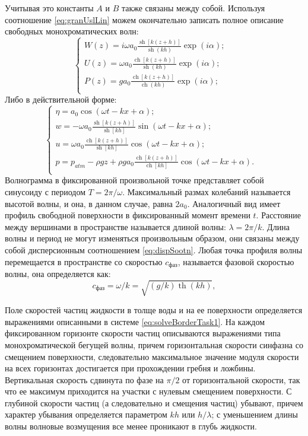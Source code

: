 Учитывая это константы $A$ и $B$ также связаны между собой. Используя соотношение \eqref{eq:granUslLin} можем окончательно записать полное описание свободных монохроматических волн:
\begin{equation}\label{eq:solveBorderTask1}
  \begin{cases}
  W(z)=i\omega a_0\frac{\operatorname{sh}[k(z+h)]}{\operatorname{sh}(kh)}\exp(i\alpha); & \\
  U(z)=\omega a_0\frac{\operatorname{ch}[k(z+h)]}{\operatorname{sh}(kh)}\exp(i\alpha); & \\
  P(z)=g a_0\frac{\operatorname{ch}[k(z+h)]}{\operatorname{ch}(kh)}\exp(i\alpha); & \\
  \end{cases}
\end{equation}
Либо в действительной форме:
\begin{equation}\label{eq:solveBorderTask1}
  \begin{cases}
  \eta=a_0\cos(\omega t-kx+\alpha); & \\
  w = -\omega a_0\frac{\operatorname{sh}[k(z+h)]}{\operatorname{sh}[kh]}\sin(\omega t - kx+\alpha); & \\
  u = \omega a_0\frac{\operatorname{ch}[k(z+h)]}{\operatorname{sh}[kh]}\cos(\omega t - kx+\alpha); & \\
  p = p_{atm}-\rho gz+\rho ga_0\frac{\operatorname{ch}[k(z+h)]}{\operatorname{ch}[kh]}\cos(\omega t - kx+\alpha). & \\
  \end{cases}
\end{equation}
Волнограмма в фиксированной произвольной точке представляет собой синусоиду с периодом $T=2\pi/\omega$. Максимальный размах колебаний называется высотой волны, и она, в данном случае, равна $2a_0$. Аналогичный вид имеет профиль свободной поверхности в фиксированный момент времени $t$. Расстояние между вершинами в пространстве называется длиной волны: $\lambda=2\pi/k$. Длина волны и период не могут изменяться произвольным образом, они связаны между собой дисперсионным соотношением \eqref{eq:dispSootn}. Любая точка профиля волны перемещается в пространстве со скоростью $c_{\text{фаз}}$, называется фазовой скоростью волны, она определяется как:
\begin{equation}\label{eq:fazSpeed}
  c_{\text{фаз}}=\omega/k=\sqrt{(g/k)\operatorname{th}(kh)},
\end{equation}

Поле скоростей частиц жидкости в толще воды и на ее поверхности определяется выражениями описанными в системе \eqref{eq:solveBorderTask1}. На каждом фиксированном горизонте скорости частиц описываются выражениями типа монохроматической бегущей волны, причем горизонтальная скорости синфазна со смещением поверхности, следовательно максимальное значение модуля скорости на всех горизонтах достигается при прохождении гребня и ложбины. Вертикальная скорость сдвинута по фазе на $\pi/2$ от горизонтальной скорости, так что ее максимум приходится на участки с нулевым смещением поверхности. С глубиной скорости частиц (а следовательно и смещения частиц) убывают, причем характер убывания определяется параметром $kh$ или $h/\lambda$; с уменьшением длины волны волновые возмущения все менее проникают в глубь жидкости.

